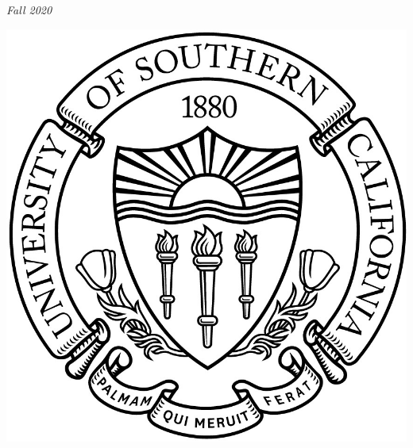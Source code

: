 \begin{titlepage}
	\textit{Fall 2020} %

	\vspace{4\baselineskip} %
	

    \includegraphics{seal}

\end{titlepage}



